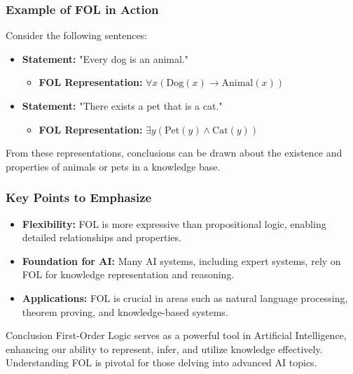 \documentclass[aspectratio=169]{beamer}
\begin{document}
\begin{frame}[fragile]
  \frametitle{Example of FOL in Action}
  
  Consider the following sentences:
  
  \begin{itemize}
    \item \textbf{Statement:} "Every dog is an animal."
      \begin{itemize}
        \item \textbf{FOL Representation:} $\forall x (\text{Dog}(x) \to \text{Animal}(x))$
      \end{itemize}
  
    \item \textbf{Statement:} "There exists a pet that is a cat."
      \begin{itemize}
        \item \textbf{FOL Representation:} $\exists y (\text{Pet}(y) \land \text{Cat}(y))$
      \end{itemize}
  \end{itemize}
  
  From these representations, conclusions can be drawn about the existence and properties of animals or pets in a knowledge base.
\end{frame}

\begin{frame}[fragile]
  \frametitle{Key Points to Emphasize}
  \begin{itemize}
    \item \textbf{Flexibility:} FOL is more expressive than propositional logic, enabling detailed relationships and properties.
    
    \item \textbf{Foundation for AI:} Many AI systems, including expert systems, rely on FOL for knowledge representation and reasoning.
    
    \item \textbf{Applications:} FOL is crucial in areas such as natural language processing, theorem proving, and knowledge-based systems.
  \end{itemize}
  
  \begin{block}{Conclusion}
    First-Order Logic serves as a powerful tool in Artificial Intelligence, enhancing our ability to represent, infer, and utilize knowledge effectively. Understanding FOL is pivotal for those delving into advanced AI topics.
  \end{block}
\end{frame}
\end{document}
